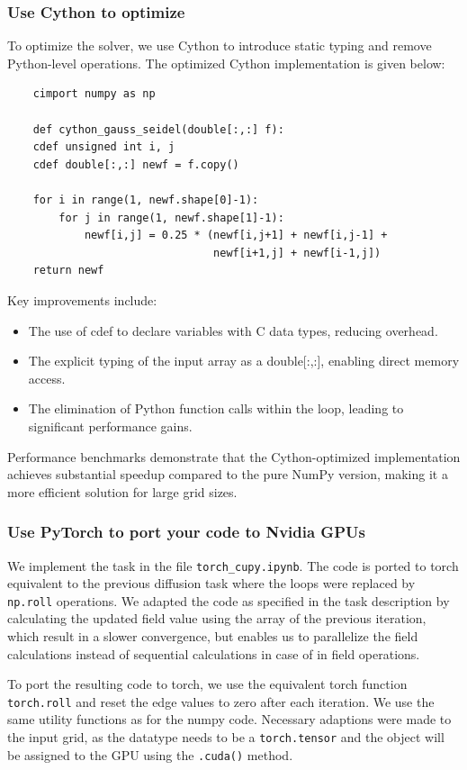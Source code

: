 \documentclass[a4paper,12pt]{article}
\begin{document}
\subsubsection{Use Cython to optimize}

To optimize the solver, we use Cython to introduce static typing and remove Python-level operations. The optimized Cython implementation is given below:

\begin{verbatim}
    cimport numpy as np

    def cython_gauss_seidel(double[:,:] f):
    cdef unsigned int i, j
    cdef double[:,:] newf = f.copy()

    for i in range(1, newf.shape[0]-1):
        for j in range(1, newf.shape[1]-1):
            newf[i,j] = 0.25 * (newf[i,j+1] + newf[i,j-1] +
                                newf[i+1,j] + newf[i-1,j])
    return newf
\end{verbatim}

Key improvements include:
\begin{itemize}
    \item The use of cdef to declare variables with C data types, reducing overhead.
    \item The explicit typing of the input array as a double[:,:], enabling direct memory access.
    \item The elimination of Python function calls within the loop, leading to significant performance gains.
\end{itemize}

Performance benchmarks demonstrate that the Cython-optimized implementation achieves substantial speedup compared to the pure NumPy version, making it a more efficient solution for large grid sizes.

\subsubsection{Use PyTorch to port your code to Nvidia GPUs}
We implement the task in the file \verb|torch_cupy.ipynb|. The code is ported to torch equivalent to the previous diffusion task
where the loops were replaced by \verb|np.roll| operations. We adapted the code as specified in the task description by calculating the
updated field value using the array of the previous iteration, which result in a slower convergence, but enables us to parallelize the field calculations
instead of sequential calculations in case of in field operations.

To port the resulting code to torch, we use the equivalent torch function \verb|torch.roll| and reset the edge values to zero after each iteration. We use the same utility functions as for the numpy code.
Necessary adaptions were made to the input grid, as the datatype needs to be a \verb|torch.tensor| and the object will be assigned to the GPU using the \verb|.cuda()| method.
\end{document}
